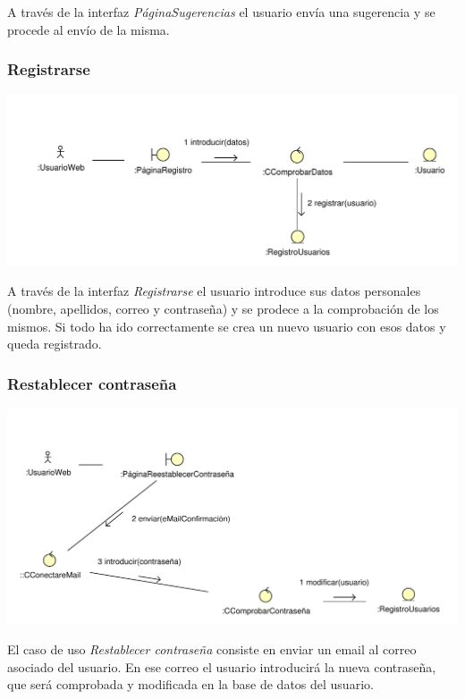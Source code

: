 \documentclass[11pt, a4paper, twoside, titlepage]{article}
\begin{document}
					A través de la interfaz {\itshape PáginaSugerencias} el usuario envía una sugerencia y se procede al envío de la misma.

			\subsubsection{Registrarse}
				\begin{center}
					\includegraphics[scale=.8]{analisis/diagramas/registrarse.pdf}
				\end{center}
				
					A través de la interfaz {\itshape Registrarse} el usuario introduce sus datos personales (nombre, apellidos, correo y contraseña) y se prodece a la comprobación de los mismos. Si todo ha ido correctamente se crea un nuevo usuario con esos datos y queda registrado.

			\subsubsection{Restablecer contraseña}
				\begin{center}
					\includegraphics[scale=.77]{analisis/diagramas/restablecercontrasena.pdf}
				\end{center}
				
					El caso de uso {\itshape Restablecer contraseña} consiste en enviar un email  al correo asociado del usuario. En ese correo el usuario introducirá la nueva contraseña, que será comprobada y modificada en la base de datos del usuario.
			
\end{document}
